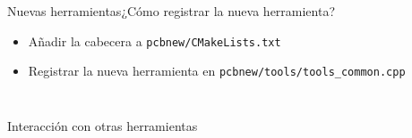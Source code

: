 \begin{frame}{Nuevas herramientas}{¿Cómo registrar la nueva herramienta?}
	\begin{center}
	\begin{minipage}{0.8\textwidth}
		\begin{itemize}
			\pause
			\item[\faCode] Añadir la cabecera a \texttt{pcbnew/CMakeLists.txt}
			\pause
			\item[\faCode] Registrar la nueva herramienta en \texttt{pcbnew/tools/tools_common.cpp}
			\pause
		\end{itemize}
	\end{minipage}
	\end{center}

	\begin{center}
		\begin{minipage}{0.95\textwidth}
			\inputminted[fontsize=\small]{cpp}{code/cpp/register_tool.cpp}
		\end{minipage}
	\end{center}
\end{frame}




\begin{frame}
	\begin{center}
	\begin{minipage}{0.7\textwidth}
		\inputminted[fontsize=\large]{cpp}{code/cpp/commit.cpp}
	\end{minipage}
\end{center}
\end{frame}


\begin{frame}{Interacción con otras herramientas}
\begin{center}
	\begin{minipage}{0.7\textwidth}
	\end{minipage}
\end{center}
\end{frame}

